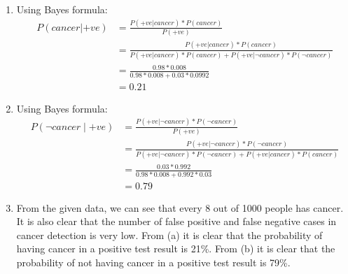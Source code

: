 \begin{enumerate}
    \item Using Bayes formula:
    \begin{align*}
      P(cancer | +ve) &= \frac{P(+ve | cancer) \ast P(cancer)}{P(+ve)} \\[10pt]
                        &= \frac{P(+ve | cancer) \ast P(cancer)}{P(+ve | cancer) \ast P(cancer)+P(+ve | \neg cancer) \ast P(\neg cancer)} \\[10pt]
                        &= \frac{0.98 * 0.008}{0.98 * 0.008 + 0.03 * 0.0992} \\[10pt]
                        &= 0.21 
    \end{align*}

    \item Using Bayes formula: \\
    \begin{align*}
        P(\neg cancer\mid+ve)   &=  \frac{P(+ve | \neg  cancer) \ast P(\neg cancer)}{P(+ve)} \\[10pt]
                                &= \frac{P(+ve | \neg  cancer) \ast P(\neg cancer)}{P(+ve | \neg cancer) \ast P(\neg cancer)+P(+ve | cancer) \ast P(cancer)} \\[10pt]
                                &= \frac{0.03 * 0.992}{0.98 * 0.008 + 0.992*0.03} \\[10pt]
                                &= 0.79
    \end{align*}

    \item From the given data, we can see that every 8 out of 1000 people has cancer. It is also clear that the number of false positive and false negative cases in cancer detection is very low. From (a) it is clear that the probability of having cancer in a positive test result is 21\%. From (b) it is clear that the probability of not having cancer in a positive test result is 79\%. \\
\end{enumerate} 